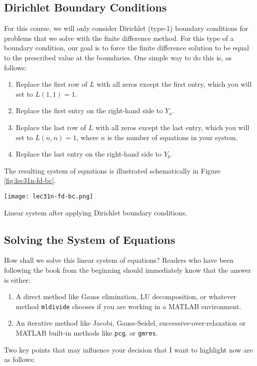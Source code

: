 \subsection{Dirichlet Boundary Conditions}
For this course, we will only consider Dirichlet (type-1) boundary conditions for problems that we solve with the finite difference method.  For this type of a boundary condition, our goal is to force the finite difference solution to be equal to the prescribed value at the boundaries.  One simple way to do this is, as follows:
\begin{enumerate}
\item Replace the first row of $L$ with all zeros except the first entry, which you will set to $L(1,1)=1$.  
\item Replace the first entry on the right-hand side to $Y_a$. 
\item Replace the last row of $L$ with all zeros except the last entry, which you will set to $L(n,n) = 1$, where $n$ is the number of equations in your system.
\item Replace the last entry on the right-hand side to $Y_b$.
\end{enumerate}
The resulting system of equations is illustrated schematically in Figure \ref{fig:lec31n-fd-bc}.
\begin{marginfigure}[1.5cm]
\texttt{[image: lec31n-fd-bc.png]}
\caption{Linear system after applying Dirichlet boundary conditions.}
\label{fig:lec31n-fd-bc}
\end{marginfigure}

\subsection{Solving the System of Equations}
How shall we solve this linear system of equations? Readers who have been following the book from the beginning should immediately know that the answer is either:
\begin{enumerate}
\item A direct method like Gauss elimination, LU decomposition, or whatever method \lstinline[style=myMatlab]{mldivide} chooses if you are working in a MATLAB environment.
\item An iterative method like Jacobi, Gauss-Seidel, successive-over-relaxation or MATLAB built-in methods like \lstinline[style=myMatlab]{pcg}, or \lstinline[style=myMatlab]{gmres}.
\end{enumerate}
Two key points that may influence your decision that I want to highlight now are as follows:

